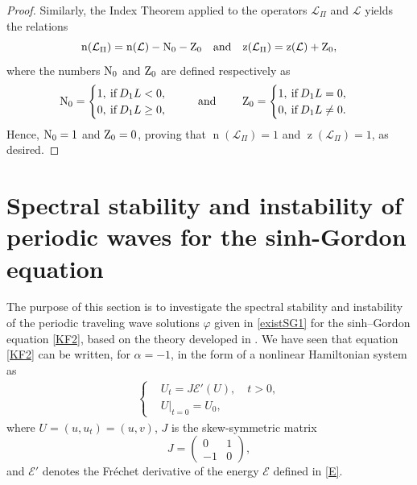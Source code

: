\documentclass[12pt,reqno,a4paper]{amsart} %
\numberwithin{equation}{section}
\numberwithin{figure}{section}
\begin{document}
\begin{proof}
 			Similarly, the Index Theorem applied to the operators $\mathcal{L}_{\Pi}$ and $\mathcal{L}$ yields the relations
 			\begin{equation}\label{indexformula120}
 				\operatorname{n}(\mathcal{L}_{{\Pi}})=\text{n}(\mathcal{L})-{\rm N}_0-{\rm Z}_0 \quad \text{and} \quad \text{z}(\mathcal{L}_{{\Pi}})=\text{z}(\mathcal{L})+{\rm Z}_0,
 			\end{equation}
 			where the numbers ${\rm N}_0$ and ${\rm Z}_0$ are defined respectively as 
 			\begin{equation}\label{N0Z0}
 				{\rm N}_0=
 				\begin{cases}
 					1, \: \text{if} \: D_1 L<0, \\
 					0, \: \text{if} \: D_1 L\geq 0,\ \
 				\end{cases}
 				\quad \text{and} \qquad\ 
 				{\rm Z}_0=
 				\begin{cases}
 					1, \: \text{if} \: D_1L=0, \\
 					0, \: \text{if} \: D_1 L \neq 0.
 				\end{cases}
 			\end{equation}
 			Hence, ${\rm N}_0=1$ and ${\rm Z}_0=0$, proving that $\operatorname{n}(\mathcal{L}_{\Pi})=1$ and $\operatorname{z}(\mathcal{L}_{\Pi})=1$, as desired. 
 		\end{proof}
 		
 
 \section{Spectral stability and instability of periodic waves for the sinh-Gordon equation}\label{section5}
 The purpose of this section is to investigate the spectral stability and instability of the periodic traveling wave solutions $\varphi$ given in \eqref{existSG1} for the sinh–Gordon equation \eqref{KF2}, based on the theory developed in \cite{kapitula,natali-thiago}. We have seen that equation \eqref{KF2} can be written, for $\alpha=-1$, in the form of a nonlinear Hamiltonian system as
 \begin{align}\label{hamilt310}
 	\begin{cases}
 		&	U_t=J \mathcal{E}'(U),\quad t>0,\\ 
 		&U|_{t=0}=U_0,
 	\end{cases}	
 \end{align}   where $U=(u,u_t)=(u,v)$, $J$ is the skew-symmetric matrix
 \begin{equation}\label{matrixJ}
 	J=\left(
 	\begin{array}{cc}
 		0 & 1\\
 		-1 & 0\end{array}
 	\right),
 \end{equation} \noindent and $\mathcal{E}'$ denotes the Fr\'echet derivative of the energy $\mathcal{E}$ defined in \eqref{E}.
 
\end{document}
